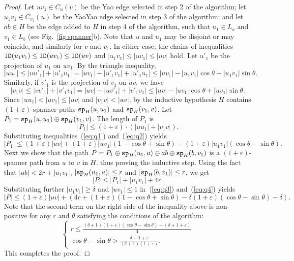 \documentclass{llncs}
\newcommand{\ABox}{
\raisebox{3pt}{\framebox[6pt]{\rule{6pt}{0pt}}}
}
\newcommand{\e}{\varepsilon}
\newcommand{\id}{{\tt ID}}
\newcommand{\ssp}{{\tt sp}}
\newcommand{\N}{L}  \newcommand{\C}{C}
\begin{document}
\begin{proof}
Let $uv_1 \in \C_u(v)$ be the Yao edge selected in step 2 of the algorithm;
let $u_1v_1 \in C_{v_1}(u)$ be the YaoYao edge selected in step 3 of the algorithm;
and let $ab \in H$ be the edge added to $H$ in step 4 of the algorithm, such that
$u_1 \in \N_a$ and $v_1 \in \N_b$ (see Fig.~\ref{fig:spanner}b).
Note that $u$ and $u_1$ may be disjoint or may coincide, and similarly
for $v$ and $v_1$. In either case, the chains of inequalities
$\id(u_1v_1) \le \id(uv_1) \le \id(uv)$ and $|u_1v_1| \le |uv_1| \le |uv|$ hold.
Let $u'_1$ be the projection of $u_1$ on $uv_1$.
By the triangle inequality,
\begin{equation}
|uu_1| \le |uu'_1|+|u'_1u_1| = |uv_1| - |u'_1v_1| + |u'_1u_1| \le
|uv_1| - |u_1v_1|\cos\theta + |u_1v_1|\sin\theta. \label{eq:q1}
\end{equation}
Similarly, if $v'_1$ is the projection of $v_1$ on $uv$, we have
\begin{equation}
|v_1v| \le |vv'_1|+|v'_1v_1| = |uv| - |uv'_1| + |v'_1v_1| \le |uv| -
|uv_1|\cos\theta + |uv_1|\sin\theta. \label{eq:q2}
\end{equation}
Since $|uu_1| < |uv_1| \le |uv|$ and $|v_1v| < |uv|$, by the inductive
hypothesis $H$ contains $(1+\e)$-spanner paths $\ssp_H(u,u_1)$ and $\ssp_H(v_1,v)$.
Let $P_1 = \ssp_H(u,u_1) \oplus \ssp_H(v_1, v)$.
The length of $P_1$ is
$$
|P_1| \le (1+\e)\cdot(|uu_1| + |v_1v|).
$$
Substituting inequalities~(\ref{eq:q1}) and~(\ref{eq:q2}) yields
\begin{equation}
|P_1| \le (1+\e)|uv| + (1+\e)|uv_1|(1-\cos\theta +\sin\theta) - (1+\e)|u_1v_1|(\cos\theta  - \sin\theta).
\label{eq:q3}
\end{equation}
Next we show that the path $P = P_1 \oplus \ssp_H(u_1, a) \oplus ab \oplus \ssp_H(b, v_1)$ is a $(1+\e)$-spanner path from $u$ to $v$ in $H$, thus proving the inductive step. Using the fact that $|ab| < 2r + |u_1v_1|$, $|\ssp_H(u_1,a)| \le r$ and $|\ssp_H(b, v_1)| \le r$, we get
\begin{equation}
|P| \le |P_1| + |u_1v_1| + 4r.
\label{eq:q4}
\end{equation}
Substituting further $|u_1v_1| \ge \delta$ and $|uv_1| \le 1$ in~(\ref{eq:q3}) and~(\ref{eq:q4}) yields
$$
|P| \le (1+\e) |uv| + (4r + (1+\e)(1-\cos\theta +\sin\theta) - \delta(1+\e)(\cos\theta  - \sin\theta)-\delta).
$$
Note that the second term on the right side of the inequality above is
non-positive for any $r$ and $\theta$ satisfying the conditions of the algorithm:
\[
\begin{cases}
r \le \frac{(\delta+1)(1+\e)(\cos\theta - \sin\theta) - (\delta+1+\e)}{4} \\
\cos\theta - \sin\theta > \frac{\delta+1+\e}{(\delta+1)(1+\e)}.
\end{cases}
\]
This completes the proof. \hfill\ABox
\end{proof}
\end{document}
